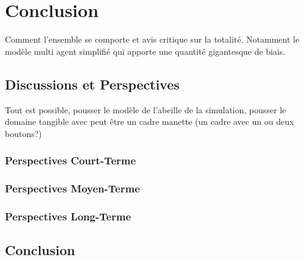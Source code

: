 \chapter*{Conclusion}

	Comment l'ensemble se comporte et avis critique sur la totalité. Notamment le modèle multi agent simplifié qui apporte une quantité gigantesque de biais.
\section*{Discussions et Perspectives}
	Tout est possible, pousser le modèle de l'abeille de la simulation, pousser le domaine tangible avec peut être un cadre manette (un cadre avec un ou deux boutons?)
	\subsection{Perspectives Court-Terme}	
	\subsection{Perspectives Moyen-Terme}	
	\subsection{Perspectives Long-Terme}		
	
\section*{Conclusion}
	